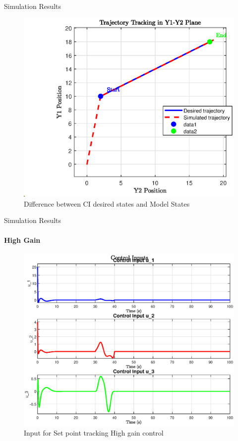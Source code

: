 \begin{frame}{Simulation Results}
\begin{figure}
    \centering
    \includegraphics[width=0.8\linewidth]{imgs/Simulation/XYTrajectory.eps}
    \caption{Difference between CI desired states and Model States}
\end{figure}

\end{frame}



\begin{frame}{Simulation Results}
\framesubtitle{High Gain}
    \begin{figure}
    \centering
    \includegraphics[width=0.8\linewidth]{imgs/Simulation/u_HG.eps}
    \caption{Input for Set point tracking High gain control}
\end{figure}
\end{frame}


